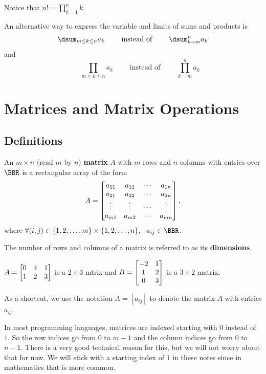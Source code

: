 \begin{exa}
Notice that $\displaystyle n! = \prod_{k=1}^n k$.
\end{exa}

\begin{rem}
An alternative way to express the variable and limits of sums and products is
$$ \dsum_{m\leq k \leq n} a_k \qquad \mbox{ instead of } \qquad \dsum_{k=m}^{n}a_k$$
and
$$\qquad \prod_{m\leq k \leq n}a_k \qquad\mbox{ instead of } \qquad \prod_{k=m}^{n} a_k$$
\end{rem}


\newpage

\section{Matrices and Matrix Operations}\label{sec:matrix}
\subsection{Definitions}\label{subsec:matDef}
\begin{df}
An  $m\times n$ (read $m$ by $n$) {\bf matrix} $A$ with $m$ rows and $n$ columns with entries
over $\BBR$ is a rectangular array of the form
$$A = \begin{bmatrix}a_{11} & a_{12} & \cdots & a_{1n} \cr a_{21} & a_{22} & \cdots & a_{2n} \cr
\vdots & \vdots & \cdots & \vdots \cr a_{m1} & a_{m2} & \cdots &
a_{mn} \cr \end{bmatrix},$$ where $\forall (i, j) \in \{1, 2, \ldots
, m \}\times \{1, 2, \ldots , n\}, \ \ a_{ij}\in \BBR$.

\noindent
The number of rows and columns of a matrix is referred to
as its {\bf dimensions}.
\end{df}

\begin{exa}
$A = \begin{bmatrix}0 & 4 & 1 \cr 1 & 2 & 3 \cr\end{bmatrix}$ 
is a $2\times 3$ mtrix and 
$B = \begin{bmatrix}-2 & 1 \cr 1 & 2 \cr 0 & 3 \cr\end{bmatrix}$ 
is a $3\times 2$ matrix.
\end{exa}
\begin{rem}
As a shortcut, we use the notation $A = [a_{ij}]$ to denote
the matrix $A$ with entries $a_{ij}$. 
\end{rem}
\begin{rem}
In most programming languages, matrices are
indexed starting with $0$ instead of $1$. So the row indices 
go from $0$ to $m-1$ and the column indices go from $0$ to $n-1$.
There is a very good technical reason for this, but we will not worry
about that for now.
We will stick with a starting index of $1$ in these notes
since in mathematics that is more common.
\end{rem}

